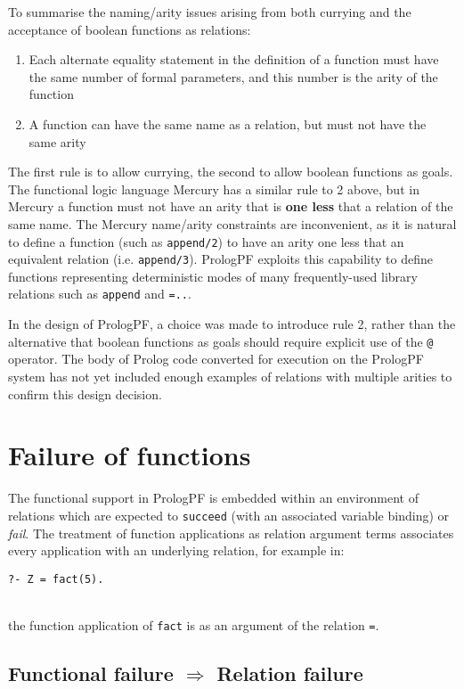 To summarise the naming/arity issues arising from both currying and the
acceptance of boolean functions as relations:
\begin{enumerate}
\item{Each alternate equality statement in the definition of a function must
  have the same number of formal parameters, and this number is the arity of
  the function}
\item{A function can have the same name as a relation, but must not have
  the same arity}
\end{enumerate}
The first rule is to allow currying, the second to allow boolean functions as
goals.  The functional logic language Mercury has a similar rule to 2 above,
but in Mercury a function must not have an arity that is \textbf{one less} that a
relation of the same name.  The Mercury name/arity constraints are inconvenient,
as it is natural to define a function (such as \texttt{append/2}) to have an
arity one less that an equivalent relation (i.e. \texttt{append/3}).  PrologPF
exploits this capability to define functions representing deterministic modes
of many frequently-used
library relations such as \texttt{append} and \texttt{=..}.

In the design of PrologPF, a choice was made to introduce rule 2, rather than
the alternative that boolean functions as goals should require explicit use of 
the \texttt{@} operator.  The body of Prolog code converted for execution on
the PrologPF system has not yet included enough examples of relations with
multiple arities to confirm this design decision.

\section{Failure of functions} %
\label{fail}

The functional support in PrologPF is embedded within an environment of
relations which are expected to \texttt{succeed} (with an associated
variable binding) or \textit{fail}.  The treatment of function applications as
relation argument terms associates every application with an underlying relation,
for example in:\\
\centerline{\texttt{?- Z = fact(5).}}\\
the function application of \texttt{fact} is as an argument of the
relation \texttt{=}.

\subsection{Functional failure $\Rightarrow$ Relation failure}
\label{func_fail}

